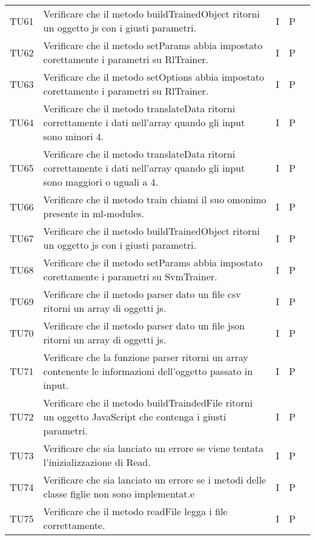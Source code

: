 \begin{longtable} {
		>{}p{15mm} 
		>{}p{79.5mm}
		>{}p{15mm} 
		>{}p{15mm}
		>{}p{0mm}}
	TU61		& Verificare che il metodo buildTrainedObject ritorni un oggetto js con i giusti parametri. & I & P &\TBstrut \\ [2mm]
	TU62		& Verificare che il metodo setParams abbia impostato corettamente i parametri su RlTrainer. & I & P &\TBstrut \\ [2mm]
	TU63		& Verificare che il metodo setOptions abbia impostato corettamente i parametri su RlTrainer. & I & P &\TBstrut \\ [2mm]
	TU64		& Verificare che il metodo translateData ritorni correttamente i dati nell'array quando gli input sono minori 4.& I & P &\TBstrut \\ [2mm]
	TU65		& Verificare che il metodo translateData ritorni correttamente i dati nell'array quando gli input sono maggiori o uguali a 4.& I & P &\TBstrut \\ [2mm]
	TU66		& Verificare che il metodo train chiami il suo omonimo presente in ml-modules.& I & P &\TBstrut \\ [2mm]
	TU67		& Verificare che il metodo buildTrainedObject ritorni un oggetto js con i giusti parametri.& I & P &\TBstrut \\ [2mm]
	TU68		& Verificare che il metodo setParams abbia impostato corettamente i parametri su SvmTrainer.& I & P &\TBstrut \\ [2mm]
	TU69		& Verificare che il metodo parser dato un file csv ritorni un array di oggetti js.& I & P &\TBstrut \\ [2mm]
	TU70		& Verificare che il metodo parser dato un file json ritorni un array di oggetti js.& I & P &\TBstrut \\ [2mm]
	TU71		& Verificare che la funzione parser ritorni un array contenente le informazioni dell'oggetto passato in input.& I & P &\TBstrut \\ [2mm]
	TU72		& Verificare che il metodo buildTraindedFile ritorni un oggetto JavaScript che contenga i giusti parametri.& I & P &\TBstrut \\ [2mm]
	TU73		& Verificare che sia lanciato un errore se viene tentata l'inizializzazione di Read.& I & P &\TBstrut \\ [2mm]
	TU74		& Verificare che sia lanciato un errore se i metodi delle classe figlie non sono implementat.e& I & P &\TBstrut \\ [2mm]
	TU75		& Verificare che il metodo readFile legga i file correttamente.& I & P &\TBstrut \\ [2mm]

\end{longtable}
